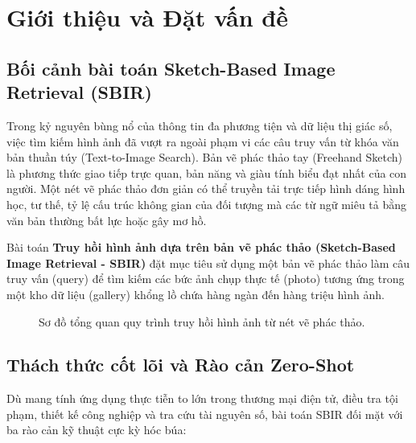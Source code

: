 \documentclass[12pt,a4paper]{report}
\begin{document}
\newpage
{}

\chapter{Giới thiệu và Đặt vấn đề}

\section{Bối cảnh bài toán Sketch-Based Image Retrieval (SBIR)}
Trong kỷ nguyên bùng nổ của thông tin đa phương tiện và dữ liệu thị giác số, việc tìm kiếm hình ảnh đã vượt ra ngoài phạm vi các câu truy vấn từ khóa văn bản thuần túy (Text-to-Image Search). Bản vẽ phác thảo tay (Freehand Sketch) là phương thức giao tiếp trực quan, bản năng và giàu tính biểu đạt nhất của con người. Một nét vẽ phác thảo đơn giản có thể truyền tải trực tiếp hình dáng hình học, tư thế, tỷ lệ cấu trúc không gian của đối tượng mà các từ ngữ miêu tả bằng văn bản thường bất lực hoặc gây mơ hồ.

Bài toán \textbf{Truy hồi hình ảnh dựa trên bản vẽ phác thảo (Sketch-Based Image Retrieval - SBIR)} đặt mục tiêu sử dụng một bản vẽ phác thảo làm câu truy vấn (query) để tìm kiếm các bức ảnh chụp thực tế (photo) tương ứng trong một kho dữ liệu (gallery) khổng lồ chứa hàng ngàn đến hàng triệu hình ảnh.

\begin{figure}[H]
    \centering
    \caption{Sơ đồ tổng quan quy trình truy hồi hình ảnh từ nét vẽ phác thảo.}
    \label{fig:sbir_concept}
\end{figure}

\section{Thách thức cốt lõi và Rào cản Zero-Shot}
Dù mang tính ứng dụng thực tiễn to lớn trong thương mại điện tử, điều tra tội phạm, thiết kế công nghiệp và tra cứu tài nguyên số, bài toán SBIR đối mặt với ba rào cản kỹ thuật cực kỳ hóc búa:
\end{document}
